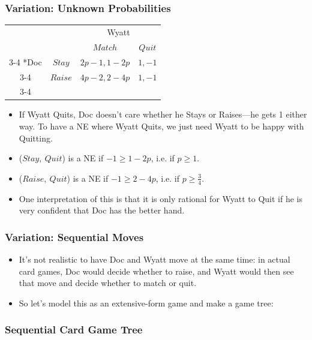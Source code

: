 
\begin{frame}
\frametitle{Variation: Unknown Probabilities}
\begin{table}[h]
\centering
\begin{tabular}{cc|c|c|}
& \multicolumn{1}{c}{} & \multicolumn{2}{c}{Wyatt}\\
& \multicolumn{1}{c}{} & \multicolumn{1}{c}{$Match$}  & \multicolumn{1}{c}{$Quit$} \\\cline{3-4}
\multirow{2}*{Doc}  & $Stay$ & $2p - 1, 1 - 2p$ & $1, -1$ \\\cline{3-4}
& $Raise$ & $4p - 2, 2 - 4p$ & $1,-1$ \\\cline{3-4}
\end{tabular}
\end{table}
\begin{itemize}
\item If Wyatt Quits, Doc doesn't care whether he Stays or Raises---he gets 1 either way. To have a NE where Wyatt Quits, we just need Wyatt to be happy with Quitting.
\item ($Stay,~Quit$) is a NE if $-1 \geq 1 - 2p$, i.e. if $p \geq 1$.
\item ($Raise,~Quit$) is a NE if $-1 \geq 2 - 4p$, i.e. if $p \geq \frac{3}{4}$.
\item One interpretation of this is that it is only rational for Wyatt to Quit if he is very confident that Doc has the better hand.
\end{itemize}
\end{frame}


\begin{frame}
\frametitle{Variation: Sequential Moves}
\begin{itemize}
\item It's not realistic to have Doc and Wyatt move at the same time: in actual card games, Doc would decide whether to raise, and Wyatt would then see that move and decide whether to match or quit.
\item So let's model this as an extensive-form game and make a game tree:
\end{itemize}
\end{frame}

\begin{frame}
\frametitle{Sequential Card Game Tree}
\end{frame}

